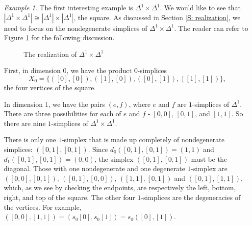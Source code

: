 \documentclass[12pt]{article}
\theoremstyle{plain}
\theoremstyle{definition}
\theoremstyle{remark}
\newtheorem{example}[theorem]{Example}
\begin{document}
\begin{example}
The first interesting example is $\Delta^1\times \Delta^1$. We would like to see that $|\Delta^1\times \Delta^1|\cong |\Delta^1|\times |\Delta^1|$, the square.  As discussed in Section \ref{S: realization}, we need to focus on the nondegenerate simplices of $\Delta^1\times \Delta^1$. The reader can refer to Figure \ref{F: fig21} for the following discussion.


\begin{figure}[!htp]
\begin{center}
\end{center}
\caption{The realization of  $\Delta^1\times \Delta^1$}\label{F: fig21}
\end{figure}

First, in dimension $0$, we have the product $0$-simplices $$X_0=\{([0],[0]),([1],[0]),([0],[1]),([1],[1])\},$$ the four vertices of the square. 

In dimension $1$, we have the pairs $(e,f)$, where $e$ and $f$ are $1$-simplices of $\Delta^1$. There are three possibilities for each of $e$ and $f$ - $[0,0]$, $[0,1]$, and $[1,1]$. So there are nine $1$-simplices of $\Delta^1\times \Delta^1$.

There is only one $1$-simplex that is made up completely of nondegenerate simplices: $([0,1],[0,1])$. Since $d_0([0,1],[0,1])=(1,1)$ and $d_1([0,1],[0,1])=(0,0)$, the simplex $([0,1],[0,1])$ must be the diagonal. Those with one nondegenerate and one degenerate $1$-simplex are  $([0,0],[0,1])$,  $([0,1],[0,0])$, $([1,1],[0,1])$ and $([0,1],[1,1])$, which, as we see by checking the endpoints, are respectively the left, bottom, right, and top of the square. The other four $1$-simplices are the degeneracies of the vertices. For example, $([0,0],[1,1])=(s_0[0],s_0[1])=s_0([0],[1])$.


\end{example}
\end{document}

